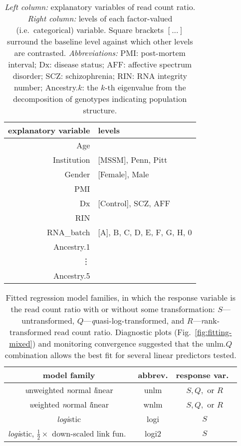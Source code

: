 \documentclass[letterpaper]{article}
\begin{document}
\begin{table}[H]
\begin{center}
\begin{tabular}{r|l}
explanatory variable & levels\\
\hline
Age &  \\
Institution & [MSSM], Penn, Pitt\\
Gender & [Female], Male\\
PMI & \\
Dx & [Control], SCZ, AFF \\
RIN &  \\
RNA\_batch & [A], B, C, D, E, F, G, H, 0\\
Ancestry.1 & \\
\vdots & \\
Ancestry.5 &  \\
\end{tabular}
\caption{ \emph{Left column:} explanatory variables of read count
ratio.  \emph{Right column:} levels of each factor-valued (i.e.~categorical)
variable.  Square brackets \([...]\) surround the baseline level against
which other levels are contrasted.  \emph{Abbreviations:} PMI: post-mortem
interval; Dx: disease status; AFF: affective spectrum disorder; SCZ:
schizophrenia; RIN: RNA integrity number;
Ancestry.\(k\): the \(k\)-th eigenvalue from the decomposition of genotypes
indicating population structure.}
\label{tab:predictors}
\end{center}
\end{table}

\begin{table}[H]
\begin{center}
\begin{tabular}{ccc}
model family & abbrev. & response var.~\\
\hline
\emph{u}nweighted \emph{n}ormal \emph{l}inear & unlm  & \(S, Q,\) or \(R\) \\
\emph{w}eighted \emph{n}ormal \emph{l}inear & wnlm  & \(S, Q,\) or \(R\) \\
\emph{logi}stic & logi & \(S\) \\
\emph{logi}stic, \(\frac{1}{2}\times\) down-scaled link fun.~& logi2 & \(S\) \\
\end{tabular}
\caption{Fitted regression model families, in which the response variable is the read count ratio with or without some transformation: 
\(S\)---untransformed, \(Q\)---\emph{q}uasi-log-transformed, and
\(R\)---\emph{r}ank-transformed read count ratio.  Diagnostic plots
(Fig.~\ref{fig:fitting-mixed}) and monitoring
convergence suggested that the \(\mathrm{unlm}.Q\) combination allows the
best fit for several linear predictors tested.
}
\label{tab:model-names}
\end{center}
\end{table}
\end{document}
